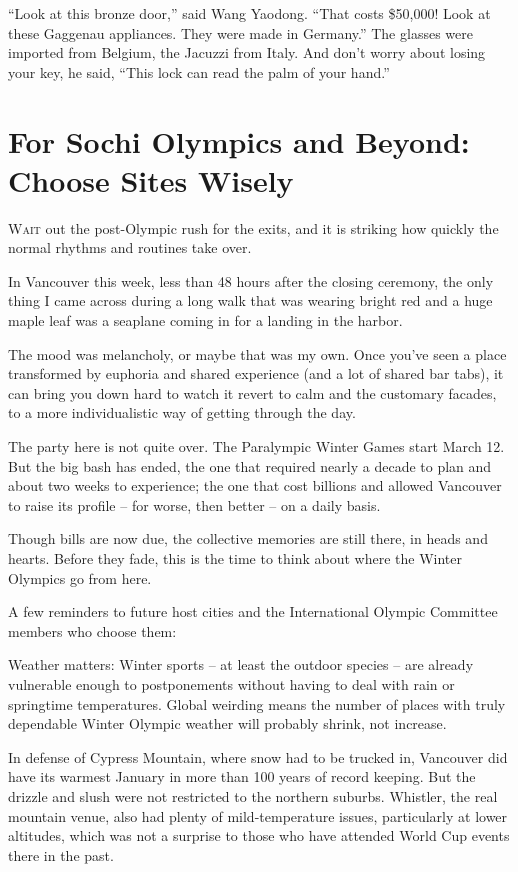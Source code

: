 ﻿\documentclass[12pt]{article}
\begin{document}
``Look at this bronze door,'' said Wang Yaodong. ``That costs \$50,000! Look at these Gaggenau
appliances. They were made in Germany.'' The glasses were imported from Belgium, the Jacuzzi from
Italy. And don't worry about losing your key, he said, ``This lock can read the palm of your hand.''

\section{For Sochi Olympics and Beyond: Choose Sites Wisely}

\lettrine{W}{ait} out the post-Olympic rush for the exits, and it is
striking how quickly the normal rhythms and routines take over.

In Vancouver this week, less than 48 hours after the closing ceremony, the only thing I came across
during a long walk that was wearing bright red and a huge maple leaf was a seaplane coming in for a
landing in the harbor.

The mood was melancholy, or maybe that was my own. Once you've seen a place transformed by euphoria
and shared experience (and a lot of shared bar tabs), it can bring you down hard to watch it revert
to calm and the customary facades, to a more individualistic way of getting through the day.

The party here is not quite over. The Paralympic Winter Games start March 12. But the big bash has
ended, the one that required nearly a decade to plan and about two weeks to experience; the one that
cost billions and allowed Vancouver to raise its profile -- for worse, then better -- on a daily
basis.

Though bills are now due, the collective memories are still there, in heads and hearts. Before they
fade, this is the time to think about where the Winter Olympics go from here.

A few reminders to future host cities and the International Olympic Committee members who choose
them:

Weather matters: Winter sports -- at least the outdoor species -- are already vulnerable enough to
postponements without having to deal with rain or springtime temperatures. Global weirding means the
number of places with truly dependable Winter Olympic weather will probably shrink, not increase.

In defense of Cypress Mountain, where snow had to be trucked in, Vancouver did have its warmest
January in more than 100 years of record keeping. But the drizzle and slush were not restricted to
the northern suburbs. Whistler, the real mountain venue, also had plenty of mild-temperature issues,
particularly at lower altitudes, which was not a surprise to those who have attended World Cup
events there in the past.
\end{document}

